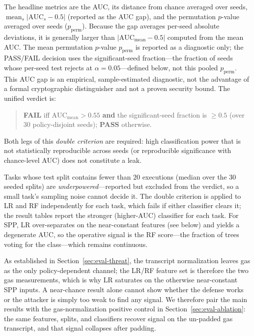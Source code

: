 The headline metrics are the AUC, its distance from chance averaged over seeds, $\operatorname{mean}_s|\mathrm{AUC}_s-0.5|$ (reported as the AUC gap), and the permutation $p$-value averaged over seeds ($p_{\mathrm{perm}}$). Because the gap averages per-seed absolute deviations, it is generally larger than $|\mathrm{AUC}_{\text{mean}}-0.5|$ computed from the mean AUC.
The mean permutation $p$-value $p_{\mathrm{perm}}$ is reported as a diagnostic only; the PASS/FAIL decision uses the significant-seed fraction---the fraction of seeds whose per-seed test rejects at $\alpha{=}0.05$---defined below, not this pooled $p_{\mathrm{perm}}$.
This AUC gap is an empirical, sample-estimated diagnostic, not the advantage of a formal cryptographic distinguisher and not a proven security bound.
The unified verdict is:
%
\begin{quote}
  \textbf{FAIL} iff $\mathrm{AUC}_{\text{mean}}>0.55$ \textbf{and} the significant-seed fraction is $\ge 0.5$ (over 30 policy-disjoint seeds);
  \textbf{PASS} otherwise.
\end{quote}
%
Both legs of this \emph{double criterion} are required: high classification power that is not statistically reproducible across seeds (or reproducible significance with chance-level AUC) does not constitute a leak.

Tasks whose test split contains fewer than $20$ executions (median over the 30 seeded splits) are \emph{underpowered}---reported but excluded from the verdict, so a small task's sampling noise cannot decide it.
The double criterion is applied to LR and RF independently for each task, which fails if either classifier clears it; the result tables report the stronger (higher-AUC) classifier for each task.
For SPP, LR over-separates on the near-constant features (see below) and yields a degenerate AUC, so the operative signal is the RF score---the fraction of trees voting for the class---which remains continuous.

As established in Section~\ref{sec:eval-threat}, the transcript normalization leaves gas
as the only policy-dependent channel; the LR/RF feature set is therefore the two gas
measurements, which is why LR saturates on the otherwise near-constant SPP inputs.
A near-chance result alone cannot show whether the defense works or the attacker is simply too weak to find any signal.
We therefore pair the main results with the gas-normalization positive control in Section~\ref{sec:eval-ablation}: the same features, splits, and classifiers recover signal on the un-padded gas transcript, and that signal collapses after padding.

